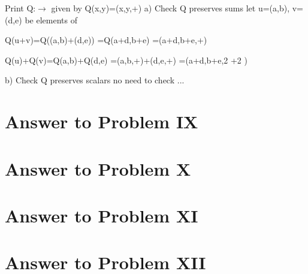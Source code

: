\documentclass[11pt,a4paper]{article}
\begin{document}
\begin{mmaCell}{Print}
Q:\(\pmb{\rightarrow}\) given by Q(x,y)=(x,y,+)
a) Check Q preserves sums
let u=(a,b), v=(d,e) be elements of 

Q(u+v)=Q((a,b)+(d,e))
=Q(a+d,b+e)
=(a+d,b+e,+)

Q(u)+Q(v)=Q(a,b)+Q(d,e)
=(a,b,+)+(d,e,+)
=(a+d,b+e,2 +2 )


b) Check Q preserves scalars
no need to check ...
\end{mmaCell}

\clearpage

\section{Answer to Problem IX}\label{sec:P09}



\clearpage

\section{Answer to Problem X}\label{sec:P10}



\clearpage

\section{Answer to Problem XI}\label{sec:P11}



\clearpage

\section{Answer to Problem XII}\label{sec:P12}



\clearpage


\printbibliography

\end{document}
